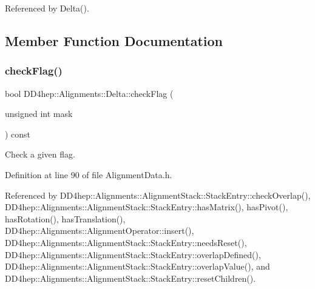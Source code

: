 Referenced by Delta().



\subsection{Member Function Documentation}
\hypertarget{class_d_d4hep_1_1_alignments_1_1_delta_a072418131860ab71ee90dda0b3fe1424}{}\label{class_d_d4hep_1_1_alignments_1_1_delta_a072418131860ab71ee90dda0b3fe1424} 
\subsubsection{\texorpdfstring{check\+Flag()}{checkFlag()}}
{\footnotesize\ttfamily bool D\+D4hep\+::\+Alignments\+::\+Delta\+::check\+Flag (\begin{DoxyParamCaption}\item[{unsigned int}]{mask }\end{DoxyParamCaption}) const\hspace{0.3cm}{\ttfamily [inline]}}



Check a given flag. 



Definition at line 90 of file Alignment\+Data.\+h.



Referenced by D\+D4hep\+::\+Alignments\+::\+Alignment\+Stack\+::\+Stack\+Entry\+::check\+Overlap(), D\+D4hep\+::\+Alignments\+::\+Alignment\+Stack\+::\+Stack\+Entry\+::has\+Matrix(), has\+Pivot(), has\+Rotation(), has\+Translation(), D\+D4hep\+::\+Alignments\+::\+Alignment\+Operator\+::insert(), D\+D4hep\+::\+Alignments\+::\+Alignment\+Stack\+::\+Stack\+Entry\+::needs\+Reset(), D\+D4hep\+::\+Alignments\+::\+Alignment\+Stack\+::\+Stack\+Entry\+::overlap\+Defined(), D\+D4hep\+::\+Alignments\+::\+Alignment\+Stack\+::\+Stack\+Entry\+::overlap\+Value(), and D\+D4hep\+::\+Alignments\+::\+Alignment\+Stack\+::\+Stack\+Entry\+::reset\+Children().

\hypertarget{class_d_d4hep_1_1_alignments_1_1_delta_a7262de6cf3b79dea8fd3b7ff86e10e10}{}\label{class_d_d4hep_1_1_alignments_1_1_delta_a7262de6cf3b79dea8fd3b7ff86e10e10} 

